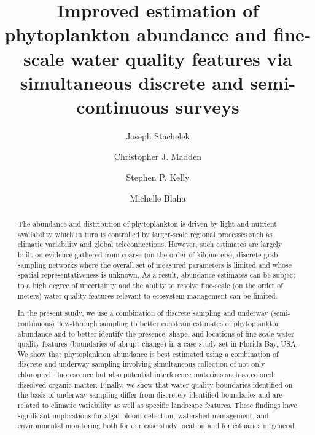 \documentclass[review]{elsarticle}
\begin{document}
  
  \begin{frontmatter}
  
  \title{Improved estimation of phytoplankton abundance and fine-scale water quality features via simultaneous discrete and semi-continuous surveys}

  \author[sfwmd,msu]{Joseph Stachelek}

  \author[sfwmd]{Christopher J. Madden}
  \author[sfwmd]{Stephen P. Kelly}
  \author[sfwmd]{Michelle Blaha}
    
  \address[sfwmd]{South Florida Water Management District \\
                 Everglades Systems Assessment Section \\
                 West Palm Beach, FL 33406, USA \\}
  \address[msu]{Department of Fisheries and Wildlife \\
                Michigan State University, \\
                East Lansing, MI 48824, USA \\}
  
  \begin{abstract}
    The abundance and distribution of phytoplankton is driven by light and nutrient availability which in turn is controlled by larger-scale regional processes such as climatic variability and global teleconnections. However, such estimates are largely built on evidence gathered from coarse (on the order of kilometers), discrete grab sampling networks where the overall set of measured parameters is limited and whose spatial representativeness is unknown. As a result, abundance estimates can be subject to a high degree of uncertainty and the ability to resolve fine-scale (on the order of meters) water quality features relevant to ecosystem management can be limited. 

    In the present study, we use a combination of discrete sampling and underway (semi-continuous) flow-through sampling to better constrain estimates of phytoplankton abundance and to better identify the presence, shape, and locations of fine-scale water quality features (boundaries of abrupt change) in a case study set in Florida Bay, USA. We show that phytoplankton abundance is best estimated using a combination of discrete and underway sampling involving simultaneous collection of not only chlorophyll fluorescence but also potential interference materials such as colored dissolved organic matter. Finally, we show that water quality boundaries identified on the basis of underway sampling differ from discretely identified boundaries and are related to climatic variability as well as specific landscape features. These findings have significant implications for algal bloom detection, watershed management, and environmental monitoring both for our case study location and for estuaries in general.
    

\end{abstract}
\end{frontmatter}
\end{document}
